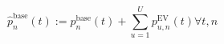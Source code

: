 \begin{equation}
	\hat{p}^\text{base}_{n}(t) := p^\text{base}_{n}(t) + \sum_{u=1}^{U} p^\text{EV}_{u,n}(t) \forall t, n
	\label{ch3:equ:updated-demand-profile}
\end{equation}